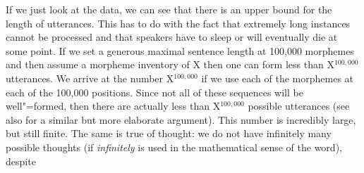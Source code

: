 \addlines
\noindent
If we just look at the data, we can see that there is an upper bound for the length of utterances. This has to do with the fact that
extremely long instances cannot be processed and that speakers have to sleep or will eventually die at some point.
If we set a generous maximal sentence length at 100,000 morphemes and then assume a morpheme inventory of X then one can form less than
X$^{100,000}$ utterances. We arrive at the number X$^{100,000}$ if we use each of the morphemes at each of the 100,000 positions.
Since not all of these sequences will be well"=formed, then there are actually less than
X$^{100,000}$ possible utterances (see also \citealp{Weydt72a} for a similar but more elaborate argument). This number
is incredibly large, but still finite. The same is true of thought: we do not have infinitely many
possible thoughts (if \emph{infinitely} is used in the mathematical sense of the word), despite
